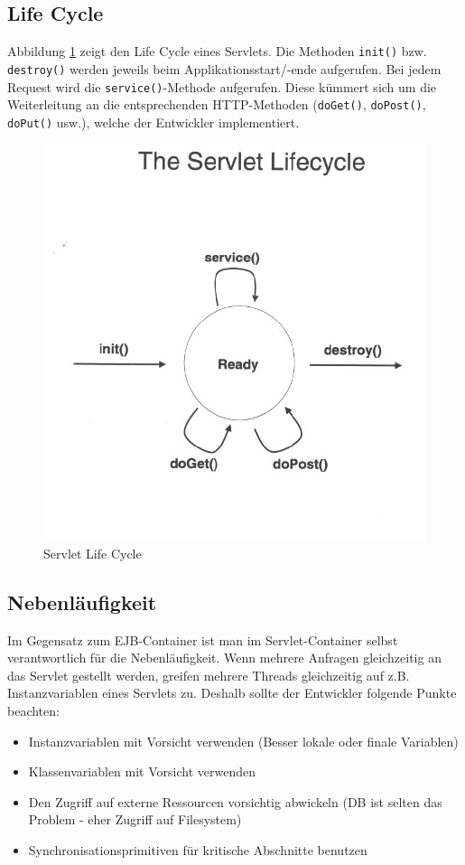 \subsection{Life Cycle}

Abbildung \ref{fig:servlet-life-cycle} zeigt den Life Cycle eines Servlets. Die Methoden \verb|init()| bzw. \verb|destroy()| werden jeweils beim Applikationsstart/-ende aufgerufen. Bei jedem Request wird die \verb|service()|-Methode aufgerufen. Diese kümmert sich um die Weiterleitung an die entsprechenden HTTP-Methoden (\verb|doGet()|, \verb|doPost()|, \verb|doPut()| usw.), welche der Entwickler implementiert.

\begin{figure}
\centering
\includegraphics[width=0.5\linewidth]{fig/servlet-life-cycle}
\caption{Servlet Life Cycle}
\label{fig:servlet-life-cycle}
\end{figure}

\subsection{Nebenläufigkeit}

Im Gegensatz zum EJB-Container ist man im Servlet-Container selbst verantwortlich für die Nebenläufigkeit. Wenn mehrere Anfragen gleichzeitig an das Servlet gestellt werden, greifen mehrere Threads gleichzeitig auf z.B. Instanzvariablen eines Servlets zu. Deshalb sollte der Entwickler folgende Punkte beachten:

\begin{itemize}
	\item Instanzvariablen mit Vorsicht verwenden (Besser lokale oder finale Variablen)
	\item Klassenvariablen mit Vorsicht verwenden
	\item Den Zugriff auf externe Ressourcen vorsichtig abwickeln (DB ist selten das Problem - eher Zugriff auf Filesystem)
	\item Synchronisationsprimitiven für kritische Abschnitte benutzen
\end{itemize}

